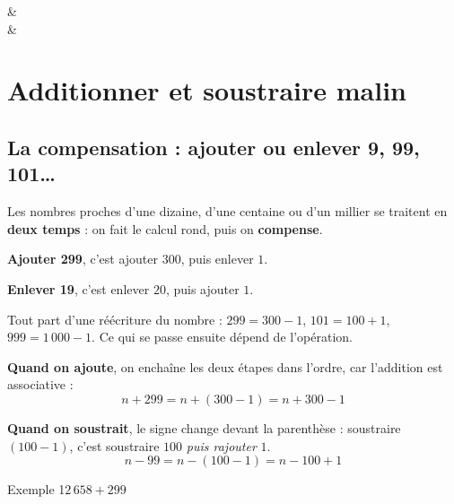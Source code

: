 \begin{exos}
   &  \\
  &  \\
\end{exos}

\section[Additionner et soustraire malin]{Additionner et soustraire malin }

\subsection{La compensation : ajouter ou enlever 9, 99, 101\ldots}

\begin{astuce}
Les nombres proches d'une dizaine, d'une centaine ou d'un millier se traitent en
\textbf{deux temps} : on fait le calcul rond, puis on \textbf{compense}.

\begin{compactitem}
\item \textbf{Ajouter 299}, c'est ajouter $300$, puis enlever $1$.
\item \textbf{Enlever 19}, c'est enlever $20$, puis ajouter $1$.
\end{compactitem}
\end{astuce}

\begin{theorie}
Tout part d'une réécriture du nombre : $299 = 300 - 1$, $101 = 100 + 1$,
$999 = 1\,000 - 1$. Ce qui se passe ensuite dépend de l'opération.

\textbf{Quand on ajoute}, on enchaîne les deux étapes dans l'ordre, car l'addition
est associative :
\[ n + 299 = n + (300 - 1) = n + 300 - 1 \]

\textbf{Quand on soustrait}, le signe change devant la parenthèse : soustraire
$(100 - 1)$, c'est soustraire $100$ \emph{puis rajouter} $1$.
\[ n - 99 = n - (100 - 1) = n - 100 + 1 \]
\end{theorie}

\begin{exemple}{Exemple 1}{$2\,658 + 299$}
\end{exemple}

